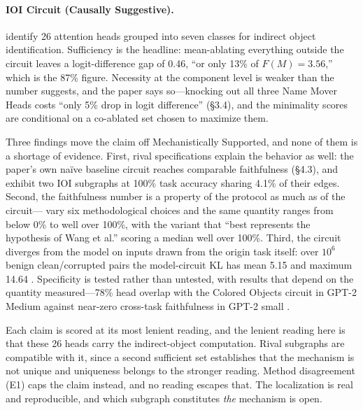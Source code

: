 \documentclass{article}
\begin{document}
\paragraph{IOI Circuit (Causally Suggestive).} \citet{wang2023interpretability} identify 26 attention heads grouped into seven classes for indirect object identification. Sufficiency is the headline: mean-ablating everything outside the circuit leaves a logit-difference gap of 0.46, ``or only 13\% of $F(M) = 3.56$,'' which is the 87\% figure. Necessity at the component level is weaker than the number suggests, and the paper says so---knocking out all three Name Mover Heads costs ``only 5\% drop in logit difference'' (\S3.4), and the minimality scores are conditional on a co-ablated set chosen to maximize them.

Three findings move the claim off Mechanistically Supported, and none of them is a shortage of evidence. First, rival specifications explain the behavior as well: the paper's own na\"ive baseline circuit reaches comparable faithfulness (\S4.3), and \citet{chen2026circuits} exhibit two IOI subgraphs at 100\% task accuracy sharing 4.1\% of their edges. Second, the faithfulness number is a property of the protocol as much as of the circuit---\citet{miller2024transformer} vary six methodological choices and the same quantity ranges from below 0\% to well over 100\%, with the variant that ``best represents the hypothesis of Wang et al.'' scoring a median well over 100\%. Third, the circuit diverges from the model on inputs drawn from the origin task itself: over $10^6$ benign clean/corrupted pairs the model-circuit KL has mean 5.15 and maximum 14.64 \citep{uitdebos2024adversarial}. Specificity is tested rather than untested, with results that depend on the quantity measured---78\% head overlap with the Colored Objects circuit in GPT-2 Medium \citep{merullo2024circuit} against near-zero cross-task faithfulness in GPT-2 small \citep{hanna2024faith}.

Each claim is scored at its most lenient reading, and the lenient reading here is that these 26 heads carry the indirect-object computation. Rival subgraphs are compatible with it, since a second sufficient set establishes that the mechanism is not unique and uniqueness belongs to the stronger reading. Method disagreement (E1) caps the claim instead, and no reading escapes that. The localization is real and reproducible, and which subgraph constitutes \emph{the} mechanism is open.
\end{document}
